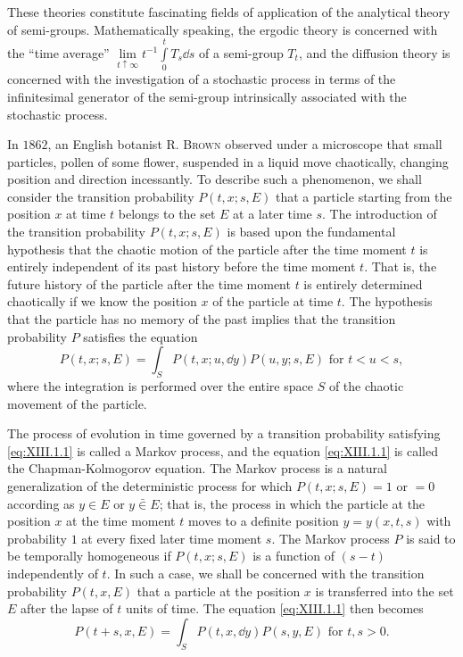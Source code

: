 \label{chap:XIII}

These theories constitute fascinating fields of application of the analytical theory of semi-groups. Mathematically speaking, the ergodic theory is concerned with the ``time average'' $\lim\limits_{t\uparrow\infty}t^{-1}\int\limits_{0}^{t}T_{s}\dd s$ of a semi-group $T_{t}$, and the diffusion theory is concerned with the investigation of a stochastic process in terms of the infinitesimal generator of the semi-group intrinsically associated with the stochastic process. 


\label{sec:XIII.1}

In $1862$, an English botanist R. \textsc{Brown} observed under a microscope that small particles, pollen of some flower, suspended in a liquid move chaotically, changing position and direction incessantly. To describe such a phenomenon, we shall consider the transition probability $P(t,x;s,E)$ that a particle starting from the position $x$ at time $t$ belongs to the set $E$ at a later time $s$. The introduction of the transition probability $P(t,x;s,E)$ is based upon the fundamental hypothesis that the chaotic motion of the particle after the time moment $t$ is entirely independent of its past history before the time moment $t$. That is, the future history of the particle after the time moment $t$ is entirely determined chaotically if we know the position $x$ of the particle at time $t$. The hypothesis that the particle has no memory of the past implies that the transition probability $P$ satisfies the equation 
\begin{equation}\label{eq:XIII.1.1}
P (t, x; s, E) = \int_{S} P (t, x; u, \dd y) P (u, y; s, E) \text{ for } t < u < s,
\end{equation}
where the integration is performed over the entire space $S$ of the chaotic movement of the particle. 

The process of evolution in time governed by a transition probability satisfying \eqref{eq:XIII.1.1} is called a Markov process, and the equation \eqref{eq:XIII.1.1} is called the Chapman-Kolmogorov equation. The Markov process is a natural generalization of the deterministic process for which $P(t, x; s, E) = 1 \text{ or } = 0$ according as $y \in E$ or $y \bar{\in} E$; that is, the process in which the particle at the position $x$ at the time moment $t$ moves to a definite position $y = y(x, t, s)$ with probability $1$ at every fixed later time moment $s$. The Markov process $P$ is said to be temporally homogeneous if $P(t, x; s, E)$ is a function of $(s - t)$ independently of $t$. In such a case, we shall be concerned with the transition probability $P(t, x, E)$ that a particle at the position $x$ is transferred into the set $E$ after the lapse of $t$ units of time. The equation \eqref{eq:XIII.1.1} then becomes 
\begin{equation}\label{eq:XIII.1.2}
P (t + s, x, E) = \int_{S} P (t, x, \dd y) P (s, y, E) \text{ for } t, s > 0.
\end{equation}

